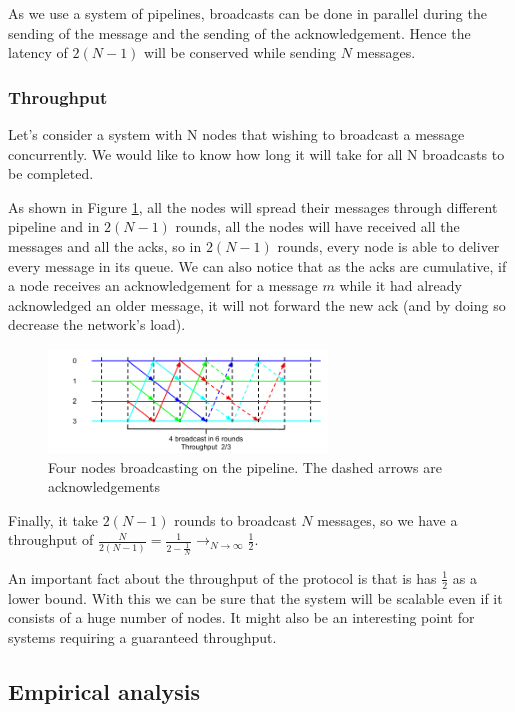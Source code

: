 \documentclass[a4paper]{article}
\begin{document}
As we use a system of pipelines, broadcasts can be done in parallel during the
sending of the message and the sending of the acknowledgement. Hence the latency
of $2(N-1)$ will be conserved while sending $N$ messages.

\subsubsection{Throughput}
Let’s consider a system with N nodes that wishing to broadcast a message
concurrently. We would like to know how long it will take for all N broadcasts
to be completed.

As shown in Figure \ref{figure:throughput2}, all the nodes will spread their
messages through different pipeline and in $2(N-1)$ rounds, all the
nodes will have received all the messages and all the acks, so in $2(N-1)$ rounds,
every node is able to deliver every message in its queue. We can also notice
that as the acks are cumulative, if a node receives an acknowledgement for a
message $m$ while it had already acknowledged an older message, it will not
forward the new ack (and by doing so decrease the network's load).

\begin{figure}[h]
    \centering
    \includegraphics[width=280px]{Throughput2.png}
    \caption{Four nodes broadcasting on the pipeline. The dashed arrows are
    acknowledgements}
    \label{figure:throughput2}
\end{figure}

Finally, it take $2(N-1)$ rounds to broadcast $N$ messages, so we have a throughput
of $\frac{N}{2(N-1)}=\frac{1}{2-\frac{1}{N}}\longrightarrow_{N \rightarrow
\infty}\frac{1}{2}$.

An important fact about the throughput of the protocol is that is has
$\frac{1}{2}$ as a lower bound. With this we can be sure that the system will
be scalable even if it consists of a huge number of nodes. It might also be an
interesting point for systems requiring a guaranteed throughput.

\subsection{Empirical analysis}
\end{document}
